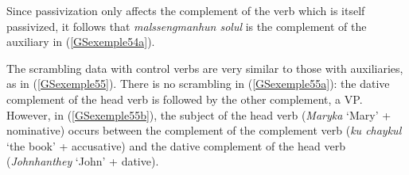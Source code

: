 {\eal
	\label{GSexemple54} 
	\label{GSexemple54a}
		
	\label{GSexemple54b}
\zl

Since passivization only affects the complement of the verb which is itself passivized, it follows that \emph{malssengmanhun solul} is the complement of the auxiliary in (\ref{GSexemple54a}).

The scrambling data with control verbs are very similar to those with auxiliaries, as in (\ref{GSexemple55}). There is no scrambling in (\ref{GSexemple55a}): the dative complement of the head verb is followed
by the other complement, a VP. However, in (\ref{GSexemple55b}), the subject of the head verb
(\emph{Maryka} `Mary' + nominative) occurs between the complement of the complement verb (\emph{ku
  chaykul} `the book' + accusative) and the dative complement of the head verb (\emph{Johnhanthey} `John' + dative).

\eal
	\label{GSexemple55} 
	\label{GSexemple55a}
		
	\label{GSexemple55b}
\zl

}
